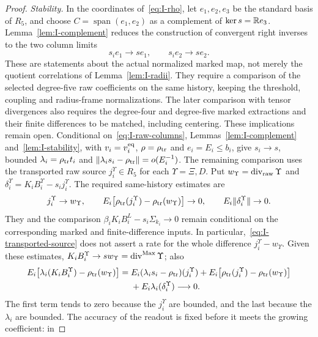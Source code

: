 \begin{proof}
\emph{Stability.} In the coordinates of~\eqref{eq:I-rho}, let $e_1,e_2,e_3$ be the standard basis of $R_5$, and choose $C=\operatorname{span}(e_1,e_2)$ as a complement of $\ker s=\mathbb{R} e_3$. Lemma~\ref{lem:I-complement} reduces the construction of convergent right inverses to the two column limits
\begin{equation}\label{eq:I-raw-columns}
s_i e_1\longrightarrow s e_1,\qquad s_i e_2\longrightarrow s e_2.
\end{equation}
These are statements about the actual normalized marked map, not merely the quotient correlations of Lemma~\ref{lem:I-radii}. They require a comparison of the selected degree-five raw coefficients on the same history, keeping the threshold, coupling and radius-frame normalizations. The later comparison with tensor divergences also requires the degree-four and degree-five marked extractions and their finite differences to be matched, including centering. These implications remain open. Conditional on~\eqref{eq:I-raw-columns}, Lemmas~\ref{lem:I-complement} and~\ref{lem:I-stability}, with $v_i=v_i^{\rm eq}$, $\rho=\rho_{\rm tr}$ and $e_i=E_i\le b_i$, give $s_i\to s$, bounded $\lambda_i=\rho_{\rm tr}t_i$ and $\|\lambda_is_i-\rho_{\rm tr}\|=o(E_i^{-1})$.
The remaining comparison uses the transported raw source $j_i^\Upsilon\in R_5$ for each $\Upsilon=\Xi,D$. Put $w_\Upsilon=\operatorname{div}_{\rm raw}\Upsilon$ and $\delta_i^\Upsilon=K_iB_i^\Upsilon-s_i j_i^\Upsilon$. The required same-history estimates are
\begin{equation}\label{eq:I-transported-source}
j_i^\Upsilon\to w_\Upsilon,\qquad
E_i\bigl[\rho_{\rm tr}(j_i^\Upsilon)-\rho_{\rm tr}(w_\Upsilon)\bigr]\to0,\qquad
E_i\|\delta_i^\Upsilon\|\to0.
\end{equation}
They and the comparison $\beta_iK_iB_i^L-s_i\Sigma_{k_i}\to0$ remain conditional on the corresponding marked and finite-difference inputs. In particular,~\eqref{eq:I-transported-source} does not assert a rate for the whole difference $j_i^\Upsilon-w_\Upsilon$. Given these estimates, $K_iB_i^\Upsilon\to s w_\Upsilon=\operatorname{div}^{\rm Max}\Upsilon$; also
\begin{align*}
E_i\bigl[\lambda_i(K_iB_i^\Upsilon)-\rho_{\rm tr}(w_\Upsilon)\bigr]
={}&E_i(\lambda_is_i-\rho_{\rm tr})(j_i^\Upsilon)
 +E_i\bigl[\rho_{\rm tr}(j_i^\Upsilon)-\rho_{\rm tr}(w_\Upsilon)\bigr]\\
&{}+E_i\lambda_i(\delta_i^\Upsilon)\longrightarrow0.
\end{align*}
The first term tends to zero because the $j_i^\Upsilon$ are bounded, and the last because the $\lambda_i$ are bounded. The accuracy of the readout is fixed before it meets the growing coefficient: in

\end{proof}
